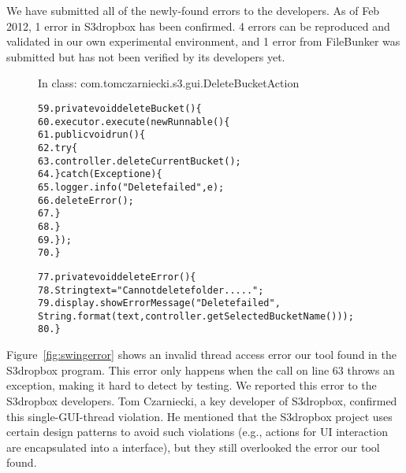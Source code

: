 We have submitted all of the newly-found errors
to the developers. As of Feb 2012, 1 error in S3dropbox has been confirmed.
4 errors can be reproduced and validated in our own experimental environment, and
1 error from FileBunker was submitted but has not been verified
by its developers yet.



\begin{figure}[t]
\hspace{4mm}\small{In class: com.tomczarniecki.s3.gui.DeleteBucketAction}
\vspace{-2mm}
\begin{CodeOut}
\begin{alltt}
59.private void deleteBucket() \{
60.    executor.execute(new Runnable() \{
61.        public void run() \{
62.            try \{
63.                controller.deleteCurrentBucket();
64.            \} catch (Exception e) \{
65.                logger.info("Delete failed", e);
66.                deleteError(); 
67.            \}
68.       \}
69.    \});
70.\}

77.private void deleteError() \{
78.    String text = "Cannot delete folder .....";
79.    display.showErrorMessage("Delete failed", 
        String.format(text, controller.getSelectedBucketName())); 
80.\}
\end{alltt}
\end{CodeOut}
\vspace*{-2.0ex}  %
\end{figure}

Figure~\ref{fig:swingerror}
shows an invalid thread access error our tool found in the S3dropbox
program. This error only happens when the 
call on line 63 throws an exception, making it hard to
detect by testing. We reported this error to the S3dropbox developers. Tom Czarniecki,
a key developer of S3dropbox, confirmed this single-GUI-thread
violation. He mentioned that the S3dropbox project uses
certain design patterns to avoid such violations (e.g.,
actions for UI interaction are encapsulated into a  interface),
but they still overlooked  the error our tool found.

